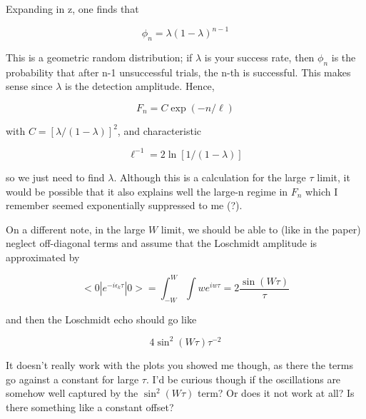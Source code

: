 \documentclass{article}
\numberwithin{equation}{section}
\newcommand{\1}{\mathbb{1}}
\begin{document}
Expanding in z, one finds that

$$\phi_n = \lambda(1-\lambda)^{n-1}$$

This is a geometric random distribution; if $\lambda$ is your success rate, then $\phi_n$ is the probability that after n-1 unsuccessful trials, the n-th is successful. This makes sense since $\lambda$ is the detection amplitude. Hence,

$$F_n = C \exp( - n / \ell )$$

with $C = [\lambda/(1-\lambda)]^2$, and characteristic

$$\ell^{-1} = 2 \ln [1 / (1 - \lambda)]$$

so we just need to find $\lambda$. Although this is a calculation for the large $\tau$ limit, it would be possible that it also explains well the large-n regime in $F_n$ which I remember seemed exponentially suppressed to me (?).

On a different note, in the large $W$ limit, we should be able to (like in the paper) neglect off-diagonal terms and assume that the Loschmidt amplitude is approximated by

$$<0| e^{-i \epsilon_k \tau} | 0> = \int_{-W}^W \int{w} e^{i w \tau} = 2 \frac{\sin(W \tau)}{\tau}$$

and then the Loschmidt echo should go like

$$4 \sin^2(W \tau) \tau^{-2}$$

It doesn’t really work with the plots you showed me though, as there the terms go against a constant for large $\tau.$ I’d be curious though if the oscillations are somehow well captured by the $\sin^2(W \tau)$ term? Or does it not work at all? Is there something like a constant offset?
\printbibliography  
\end{document}
